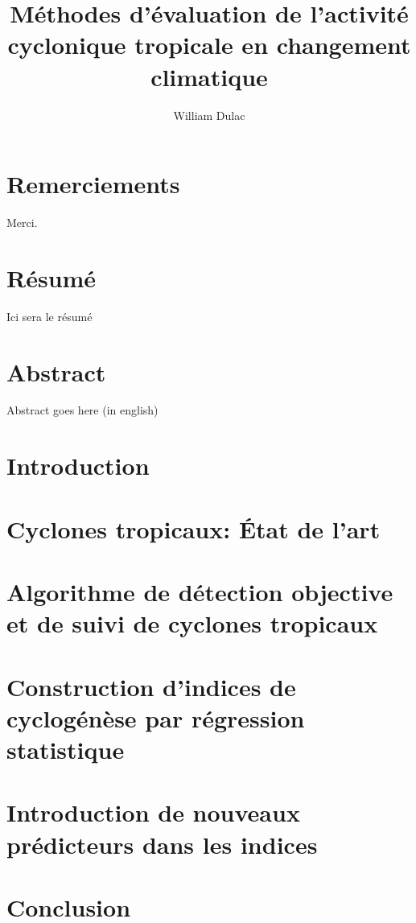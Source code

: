 \documentclass[12pt,twoside,openright]{book}
\title{Méthodes d'évaluation de l'activité cyclonique tropicale en changement climatique}
\author{William Dulac}
\begin{document}
\frontmatter

\makeflyleaf
\pagestyle{fancy}
\renewcommand{\sectionmark}[1]{%
\markboth{\thesection.\ \MakeUppercase{#1}}{}}

\dominitoc

\chapter*{Remerciements}

Merci.

\chapter*{Résumé}

Ici sera le résumé

\chapter*{Abstract}

Abstract goes here (in english)

\tableofcontents
\mainmatter

\chapter*{Introduction}

\mtcaddchapter



\chapter{Cyclones tropicaux: État de l'art}\label{chap:chapitre_1}


\chapter{Algorithme de détection objective et de suivi de cyclones tropicaux}\label{chap:chapitre_2}


\chapter{Construction d'indices de cyclogénèse par régression statistique}\label{chap:chapitre_3}


\chapter{Introduction de nouveaux prédicteurs dans les indices}\label{chap:chapitre_4}


\chapter*{Conclusion}


% 

\printbibliography
%
\end{document}
